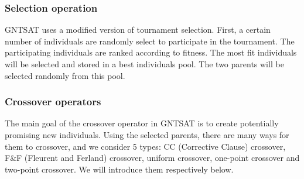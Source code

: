 \subsubsection{Selection operation}
GNTSAT uses a modified version of tournament selection. First, a certain
number of individuals are randomly select to participate in the tournament.
The participating individuals are ranked according to fitness. The most fit
individuals will be selected and stored in a best individuals pool. The two
parents will be selected randomly from this pool.

\subsubsection{Crossover operators}
The main goal of the crossover operator in GNTSAT is to create potentially
promising new individuals. Using the selected parents, there are many ways for
them to crossover, and we consider 5 types: CC (Corrective Clause) crossover,
F\&F (Fleurent and Ferland) crossover, uniform crossover, one-point crossover
and two-point crossover. We will introduce them respectively below.

